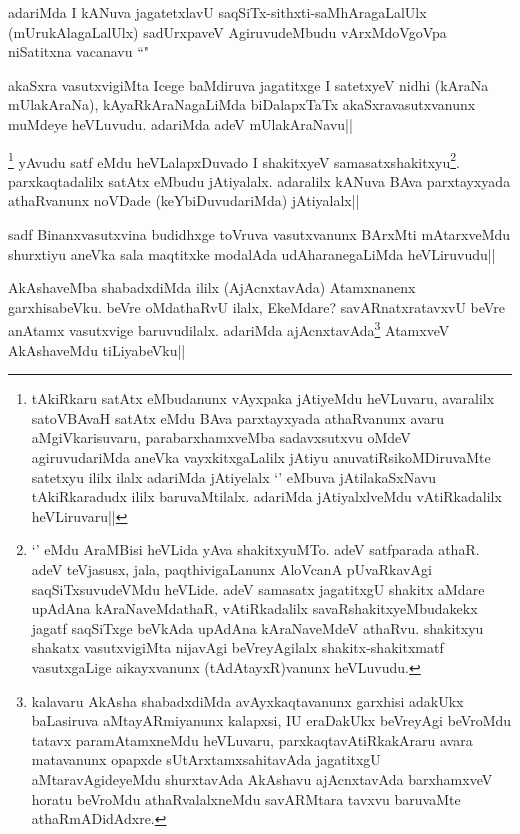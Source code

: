 
\begin{artha}
adariMda I kANuva jagatetxlavU saqSiTx-sithxti-saMhAragaLalUlx (mUrukAlagaLalUlx) sadUrxpaveV AgiruvudeMbudu vArxMdoVgoVpa niSatitxna vacanavu ``\stext " 
\end{artha}

\begin{artha}
akaSxra vasutxvigiMta Icege baMdiruva jagatitxge I satetxyeV nidhi (kAraNa mUlakAraNa), kAyaRkAraNagaLiMda biDalapxTaTx akaSxravasutxvanunx muMdeye heVLuvudu. adariMda adeV mUlakAraNavu||
\end{artha}
\begin{artha}
\footnote[1]{tAkiRkaru satAtx eMbudanunx vAyxpaka jAtiyeMdu heVLuvaru, avaralilx satoVBAvaH satAtx eMdu BAva parxtayxyada athaRvanunx avaru aMgiVkarisuvaru, parabarxhamxveMba sadavxsutxvu oMdeV agiruvudariMda aneVka vayxkitxgaLalilx jAtiyu anuvatiRsikoMDiruvaMte satetxyu ililx ilalx adariMda jAtiyelalx `\stext ' eMbuva jAtilakaSxNavu tAkiRkaradudx ililx baruvaMtilalx. adariMda jAtiyalxlveMdu vAtiRkadalilx heVLiruvaru||} yAvudu satf eMdu heVLalapxDuvado I shakitxyeV samasatxshakitxyu\footnote[2]{`\stext ' eMdu AraMBisi heVLida yAva shakitxyuMTo.  adeV satfparada athaR. adeV teVjasusx, jala, paqthivigaLanunx AloVcanA pUvaRkavAgi saqSiTxsuvudeVMdu heVLide. adeV samasatx jagatitxgU shakitx aMdare upAdAna kAraNaveMdathaR, vAtiRkadalilx savaRshakitxyeMbudakekx jagatf saqSiTxge beVkAda upAdAna kAraNaveMdeV athaRvu. shakitxyu shakatx vasutxvigiMta nijavAgi beVreyAgilalx shakitx-shakitxmatf vasutxgaLige aikayxvanunx (tAdAtayxR)vanunx heVLuvudu.}. parxkaqtadalilx satAtx eMbudu jAtiyalalx. adaralilx kANuva BAva parxtayxyada athaRvanunx noVDade (keYbiDuvudariMda) jAtiyalalx||
\end{artha}


\begin{artha}
sadf Binanxvasutxvina budidhxge toVruva vasutxvanunx BArxMti mAtarxveMdu shurxtiyu aneVka sala maqtitxke modalAda udAharanegaLiMda heVLiruvudu||
\end{artha}


\begin{artha}
AkAshaveMba shabadxdiMda ililx (AjAcnxtavAda) Atamxnanenx garxhisabeVku. beVre oMdathaRvU ilalx, EkeMdare? savARnatxratavxvU beVre anAtamx vasutxvige baruvudilalx. adariMda ajAcnxtavAda\footnote[1]{kalavaru AkAsha shabadxdiMda avAyxkaqtavanunx garxhisi adakUkx baLasiruva aMtayARmiyanunx kalapxsi, IU eraDakUkx beVreyAgi beVroMdu tatavx paramAtamxneMdu heVLuvaru, parxkaqtavAtiRkakAraru avara matavanunx opapxde sUtArxtamxsahitavAda jagatitxgU aMtaravAgideyeMdu shurxtavAda AkAshavu ajAcnxtavAda barxhamxveV horatu beVroMdu athaRvalalxneMdu savARMtara tavxvu baruvaMte athaRmADidAdxre.} AtamxveV AkAshaveMdu tiLiyabeVku||
\end{artha}

